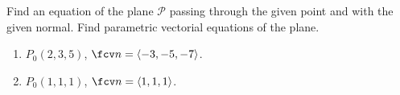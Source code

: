Find an equation of the plane $\mathcal P$ passing through the given point and with the given normal. Find parametric vectorial equations of the plane.

\begin{enumerate}
\item $P_0(2,3,5) $,  $\fcv n= \langle-3, -5, -7 \rangle$.

\item $P_0(1, 1, 1)$, $\fcv n= \langle 1,1,1 \rangle$.

\end{enumerate}